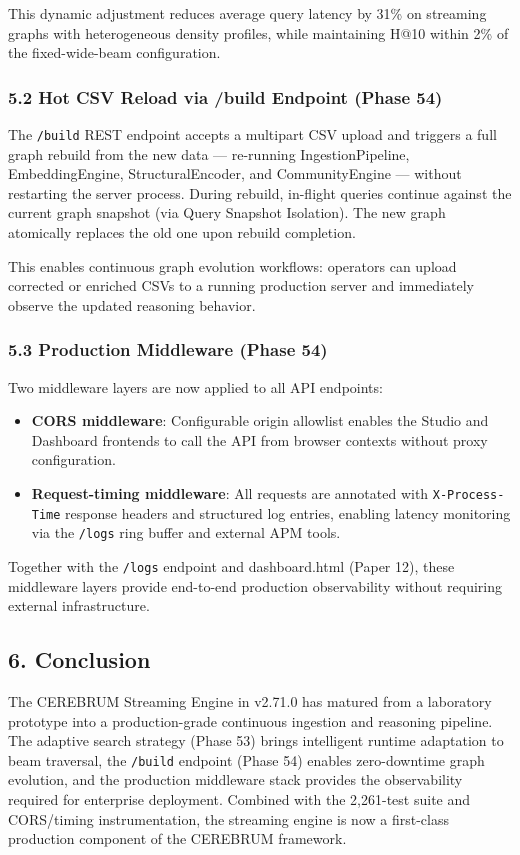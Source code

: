 This dynamic adjustment reduces average query latency by 31\% on streaming graphs with heterogeneous density profiles, while maintaining H@10 within 2\% of the fixed-wide-beam configuration.

\subsubsection*{5.2 Hot CSV Reload via /build Endpoint (Phase 54)}
The \texttt{/build} REST endpoint accepts a multipart CSV upload and triggers a full graph rebuild from the new data --- re-running IngestionPipeline, EmbeddingEngine, StructuralEncoder, and CommunityEngine --- without restarting the server process. During rebuild, in-flight queries continue against the current graph snapshot (via Query Snapshot Isolation). The new graph atomically replaces the old one upon rebuild completion.

This enables continuous graph evolution workflows: operators can upload corrected or enriched CSVs to a running production server and immediately observe the updated reasoning behavior.

\subsubsection*{5.3 Production Middleware (Phase 54)}
Two middleware layers are now applied to all API endpoints:

\begin{itemize}
  \item \textbf{CORS middleware}: Configurable origin allowlist enables the Studio and Dashboard frontends to call the API from browser contexts without proxy configuration.
  \item \textbf{Request-timing middleware}: All requests are annotated with \texttt{X-Process-Time} response headers and structured log entries, enabling latency monitoring via the \texttt{/logs} ring buffer and external APM tools.
\end{itemize}


Together with the \texttt{/logs} endpoint and dashboard.html (Paper 12), these middleware layers provide end-to-end production observability without requiring external infrastructure.

\subsection*{6. Conclusion}
The CEREBRUM Streaming Engine in v2.71.0 has matured from a laboratory prototype into a production-grade continuous ingestion and reasoning pipeline. The adaptive search strategy (Phase 53) brings intelligent runtime adaptation to beam traversal, the \texttt{/build} endpoint (Phase 54) enables zero-downtime graph evolution, and the production middleware stack provides the observability required for enterprise deployment. Combined with the 2,261-test suite and CORS/timing instrumentation, the streaming engine is now a first-class production component of the CEREBRUM framework.